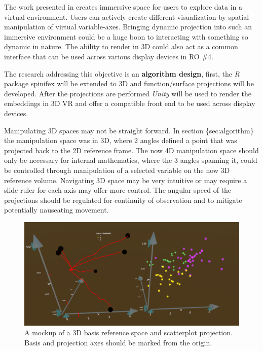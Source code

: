 \documentclass{monashthesis}
\begin{document}
The work presented in \textcite{cordeil_imaxes:_2017} creates immersive
space for users to explore data in a virtual environment. Users can
actively create different visualization by spatial manipulation of
virtual variable-axes. Bringing dynamic projection into such an
immersive environment could be a huge boon to interacting with something
so dynamic in nature. The ability to render in 3D could also act as a
common interface that can be used across various display devices in RO
\#4.

The research addressing this objective is an \textbf{algorithm design},
first, the \emph{R} package spinifex will be extended to 3D and
function/surface projections will be developed. After the projections
are performed \emph{Unity} will be used to render the embeddings in 3D
VR and offer a compatible front end to be used across display devices.

Manipulating 3D spaces may not be straight forward. In section
\{sec:algorithm\} the manipulation space was in 3D, where 2 angles
defined a point that was projected back to the 2D reference frame. The
now 4D manipulation space should only be necessary for internal
mathematics, where the 3 angles spanning it, could be controlled through
manipulation of a selected variable on the now 3D reference volume.
Navigating 3D space may be very intuitive or may require a slide ruler
for each axis may offer more control. The angular speed of the
projections should be regulated for continuity of observation and to
mitigate potentially nauseating movement.





\begin{figure}

{\centering \includegraphics[width=0.7\linewidth]{./figures/RO3MockUp2} 

}

\caption{A mockup of a 3D basis reference space and
scatterplot projection. Basis and projection axes should be marked from
the origin.}\label{fig:RO3MockUp}
\end{figure}
\end{document}
